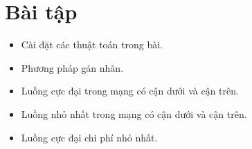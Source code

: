 \documentclass[11pt]{article}
\begin{document}
\section{Bài tập}

\begin{itemize}
  \item Cài đặt các thuật toán trong bài.
  \item Phương pháp gán nhãn.
  \item Luồng cực đại trong mạng có cận dưới và cận trên.
  \item Luồng nhỏ nhất trong mạng có cận dưới và cận trên.
  \item Luồng cực đại chi phí nhỏ nhất.
\end{itemize}
\end{document}
